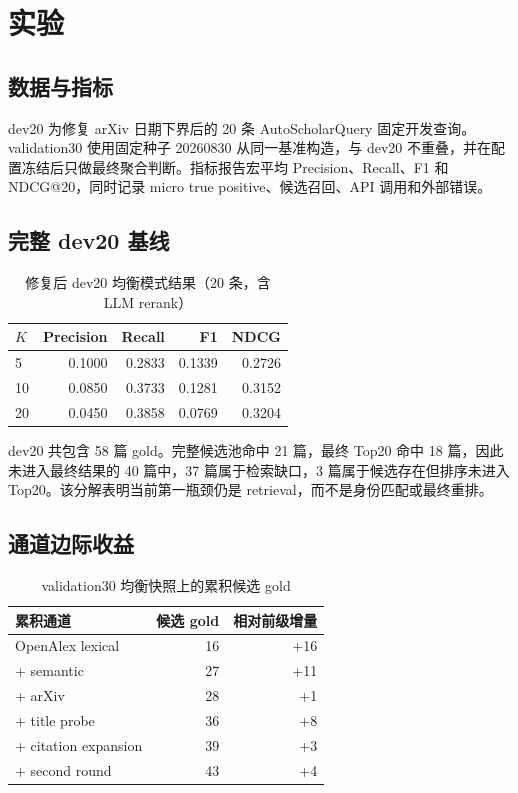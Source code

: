 \documentclass[a4paper,11pt]{ctexart}
\begin{document}
\section{实验}
\subsection{数据与指标}
dev20 为修复 arXiv 日期下界后的 20 条 AutoScholarQuery 固定开发查询。validation30 使用固定种子 20260830 从同一基准构造，与 dev20 不重叠，并在配置冻结后只做最终聚合判断。指标报告宏平均 Precision、Recall、F1 和 NDCG@20，同时记录 micro true positive、候选召回、API 调用和外部错误。

\subsection{完整 dev20 基线}
\begin{table}[ht]
\centering\caption{修复后 dev20 均衡模式结果（20 条，含 LLM rerank）}
\begin{tabular}{lrrrr}\toprule
$K$ & Precision & Recall & F1 & NDCG\\\midrule
5  & 0.1000 & 0.2833 & 0.1339 & 0.2726\\
10 & 0.0850 & 0.3733 & 0.1281 & 0.3152\\
20 & 0.0450 & 0.3858 & 0.0769 & 0.3204\\\bottomrule
\end{tabular}
\end{table}

dev20 共包含 58 篇 gold。完整候选池命中 21 篇，最终 Top20 命中 18 篇，因此未进入最终结果的 40 篇中，37 篇属于检索缺口，3 篇属于候选存在但排序未进入 Top20。该分解表明当前第一瓶颈仍是 retrieval，而不是身份匹配或最终重排。

\subsection{通道边际收益}
\begin{table}[ht]
\centering\caption{validation30 均衡快照上的累积候选 gold}
\begin{tabular}{lrr}\toprule
累积通道 & 候选 gold & 相对前级增量\\\midrule
OpenAlex lexical & 16 & +16\\
+ semantic & 27 & +11\\
+ arXiv & 28 & +1\\
+ title probe & 36 & +8\\
+ citation expansion & 39 & +3\\
+ second round & 43 & +4\\\bottomrule
\end{tabular}
\end{table}
\end{document}
